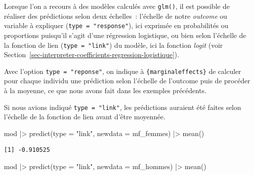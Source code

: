 \documentclass[
  letterpaper,
  DIV=11,
  numbers=noendperiod,
  oneside]{scrreprt}
\newenvironment{Shaded}{\begin{snugshade}}{\end{snugshade}}
\newcommand{\AttributeTok}[1]{\textcolor[rgb]{0.40,0.45,0.13}{#1}}
\newcommand{\FunctionTok}[1]{\textcolor[rgb]{0.28,0.35,0.67}{#1}}
\newcommand{\NormalTok}[1]{\textcolor[rgb]{0.00,0.23,0.31}{#1}}
\newcommand{\SpecialCharTok}[1]{\textcolor[rgb]{0.37,0.37,0.37}{#1}}
\newcommand{\StringTok}[1]{\textcolor[rgb]{0.13,0.47,0.30}{#1}}
\begin{document}
\begin{tcolorbox}[enhanced jigsaw, colbacktitle=quarto-callout-important-color!10!white, opacityback=0, toprule=.15mm, colback=white, coltitle=black, bottomtitle=1mm, toptitle=1mm, titlerule=0mm, rightrule=.15mm, title=\textcolor{quarto-callout-important-color}{\faExclamation}\hspace{0.5em}{Importance de l'argument \texttt{type} pour les modèles \texttt{glm}}, breakable, bottomrule=.15mm, opacitybacktitle=0.6, arc=.35mm, left=2mm, leftrule=.75mm, colframe=quarto-callout-important-color-frame]

Lorsque l'on a recours à des modèles calculés avec \texttt{glm()}, il
est possible de réaliser des prédictions selon deux échelles~: l'échelle
de notre \emph{outcome} ou variable à expliquer
(\texttt{type\ =\ "response"}), ici exprimée en probabilités ou
proportions puisqu'il s'agit d'une régression logistique, ou bien selon
l'échelle de la fonction de lien (\texttt{type\ =\ "link"}) du modèle,
ici la fonction \emph{logit} (voir
Section~\ref{sec-interpreter-coefficients-regression-logistique}).

Avec l'option \texttt{type\ =\ "reponse"}, on indique à
\texttt{\{marginaleffects\}} de calculer pour chaque individu une
prédiction selon l'échelle de l'outcome puis de procéder à la moyenne,
ce que nous avons fait dans les exemples précédents.

Si nous avions indiqué \texttt{type\ =\ "link"}, les prédictions
auraient été faites selon l'échelle de la fonction de lien avant d'être
moyennée.

\begin{Shaded}
\begin{Highlighting}[]
\NormalTok{mod }\SpecialCharTok{|\textgreater{}} \FunctionTok{predict}\NormalTok{(}\AttributeTok{type =} \StringTok{"link"}\NormalTok{, }\AttributeTok{newdata =}\NormalTok{ mf\_femmes) }\SpecialCharTok{|\textgreater{}} \FunctionTok{mean}\NormalTok{()}
\end{Highlighting}
\end{Shaded}

\begin{verbatim}
[1] -0.910525
\end{verbatim}

\begin{Shaded}
\begin{Highlighting}[]
\NormalTok{mod }\SpecialCharTok{|\textgreater{}} \FunctionTok{predict}\NormalTok{(}\AttributeTok{type =} \StringTok{"link"}\NormalTok{, }\AttributeTok{newdata =}\NormalTok{ mf\_hommes) }\SpecialCharTok{|\textgreater{}} \FunctionTok{mean}\NormalTok{()}
\end{Highlighting}
\end{Shaded}


\end{tcolorbox}
\end{document}
